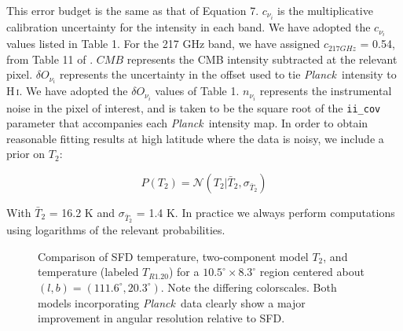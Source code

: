 \documentclass{emulateapj}
\newcommand{\PLANCK}{{\it Planck}}
\begin{document}

This error budget is the same as that of \cite{planckdust} Equation 7. 
$c_{\nu_i}$ is the multiplicative calibration uncertainty for the intensity in 
each band. We have adopted the $c_{\nu_i}$ values listed in \cite{planckdust} 
Table 1. For the 217 GHz band, we have assigned $c_{217 GHz}$ = 0.54, from 
Table 11 of \cite{planckcalib}. $CMB$ represents the CMB intensity 
subtracted at the relevant pixel. $\delta O_{\nu_i}$ represents the uncertainty
in the offset used to tie \PLANCK~intensity to H\,\textsc{i}. We have adopted 
the  $\delta O_{\nu_i}$ values of \cite{planckdust} Table 1. $n_{\nu_i}$ 
represents the instrumental noise in the pixel of interest, and is taken to be 
the square root of the \verb|ii_cov| parameter that accompanies each 
\PLANCK~intensity map. In order to obtain reasonable fitting results at high 
latitude where the data is noisy, we include a prior on $T_2$:


\begin{equation} \label{equ:t2prior}
P(T_2) = \mathcal{N}(T_2|\bar{T}_2, \sigma_{\bar{T}_2})
\end{equation}


With $\bar{T}_2$ = 16.2 K and $\sigma_{\bar{T}_2}$ = 1.4 K. In practice we 
always perform computations using logarithms of the relevant probabilities.

\begin{figure}
\begin{center}
\caption{\label{fig:comparison} Comparison of SFD temperature, two-component 
model $T_2$, and \cite{planckdust} temperature (labeled $T_{R1.20}$) for a
 $10.5^{\circ}\times8.3^{\circ}$  region centered about 
$(l,b) = (111.6^{\circ}, 20.3^{\circ})$. Note the differing colorscales. Both 
models incorporating \PLANCK~data clearly show a major improvement in angular 
resolution relative to SFD.}
\end{center}
\end{figure}
\end{document}
